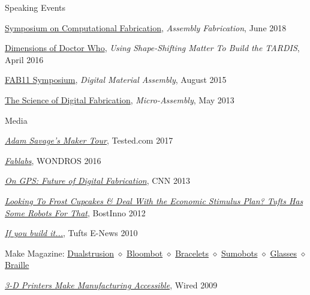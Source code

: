 \documentclass{resume} %
\begin{document}

\begin{rSection}{Speaking Events}

\href{http://cba.mit.edu/events/18.06.SCF/}{Symposium on Computational Fabrication}, {\em Assembly Fabrication}, June 2018

\href{https://mitmuseum.mit.edu/program/dimensions-doctor-who}{Dimensions of Doctor Who}, {\em Using Shape-Shifting Matter To Build the TARDIS}, April 2016

\href{http://fab11.fabevent.org/#}{FAB11 Symposium}, {\em Digital Material Assembly}, August 2015

\href{http://cba.mit.edu/events/13.03.scifab/index.html}{The Science of Digital Fabrication}, {\em Micro-Assembly}, May 2013

\end{rSection}

\begin{rSection}{Media}

\href{https://www.youtube.com/watch?v=RaHMDNf56W4}{\em Adam Savage's Maker Tour}, Tested.com 2017

\href{https://vimeo.com/181328010}{\em Fablabs}, WONDROS 2016

\href{https://www.cnn.com/videos/bestoftv/2013/07/17/exp-gps-gershenfeld-3d-printing.cnn}{\em On GPS: Future of Digital Fabrication}, CNN 2013

\href{https://www.americaninno.com/boston/looking-to-frost-cupcakes-deal-with-the-economic-stimulus-plan-tufts-has-some-robots-for-that/}{\em Looking To Frost Cupcakes \& Deal With the Economic Stimulus Plan? Tufts Has Some Robots For That}, BostInno 2012

\href{https://web.archive.org/web/20120718010336/http://enews.tufts.edu/stories/1642/2010/03/31/WillLangford}{\em If you build it...}, Tufts E-News 2010


Make Magazine:
\href{https://makezine.com/2011/09/20/more-about-dualstrusion-from-makerbot/}{Dualstrusion} $\diamond$
\href{https://makezine.com/2010/04/16/hydroponic_herb_garden/}{Bloombot} $\diamond$
\href{https://makezine.com/2010/01/14/3d-printed-bracelet-of-the-future/}{Bracelets} $\diamond$
\href{https://makezine.com/2009/11/30/makerbot-sumobot/}{Sumobots} $\diamond$
\href{https://makezine.com/2009/07/14/print-your-own-glasses/}{Glasses} $\diamond$
\href{https://makezine.com/2009/09/21/printing-braille/}{Braille}

\href{https://www.wired.com/2009/08/makerbot/}{\em 3-D Printers Make Manufacturing Accessible}, Wired 2009

\end{rSection}
\end{document}
